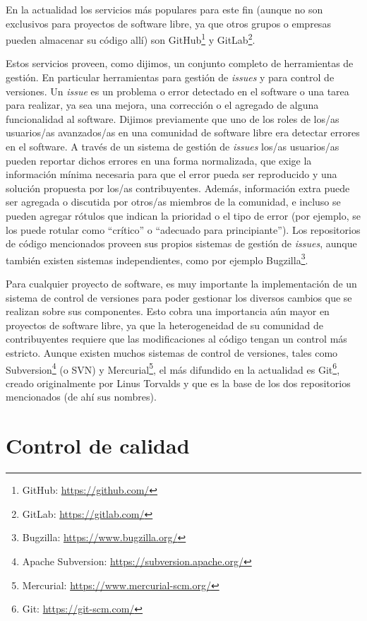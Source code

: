 En la actualidad los servicios más populares para este fin (aunque no son exclusivos para proyectos de software libre, ya que otros grupos o empresas pueden almacenar su código allí) son GitHub\footnote{GitHub: \url{https://github.com/}} y GitLab\footnote{GitLab: \url{https://gitlab.com/}}.

Estos servicios proveen, como dijimos, un conjunto completo de herramientas de gestión. En particular herramientas para gestión de \emph{issues} y para control de versiones. Un \emph{issue} es un problema o error detectado en el software o una tarea para realizar, ya sea una mejora, una corrección o el agregado de alguna funcionalidad al software. Dijimos previamente que uno de los roles de los/as usuarios/as avanzados/as en una comunidad de software libre era detectar errores en el software. A través de un sistema de gestión de \emph{issues} los/as usuarios/as pueden reportar dichos errores en una forma normalizada, que exige la información mínima necesaria para que el error pueda ser reproducido y una solución propuesta por los/as contribuyentes. Además, información extra puede ser agregada o discutida por otros/as miembros de la comunidad, e incluso se pueden agregar rótulos que indican la prioridad o el tipo de error (por ejemplo, se los puede rotular como ``crítico'' o ``adecuado para principiante''). Los repositorios de código mencionados proveen sus propios sistemas de gestión de \emph{issues}, aunque también existen sistemas independientes, como por ejemplo Bugzilla\footnote{Bugzilla: \url{https://www.bugzilla.org/}}.


Para cualquier proyecto de software, es muy importante la implementación de un sistema de control de versiones para poder gestionar los diversos cambios que se realizan sobre sus componentes. Esto cobra una importancia aún mayor en proyectos de software libre, ya que la heterogeneidad de su comunidad de contribuyentes requiere que las modificaciones al código tengan un control más estricto. Aunque existen muchos sistemas de control de versiones, tales como Subversion\footnote{Apache Subversion: \url{https://subversion.apache.org/}} (o SVN) y Mercurial\footnote{Mercurial: \url{https://www.mercurial-scm.org/}}, el más difundido en la actualidad es Git\footnote{Git: \url{https://git-scm.com/}}, creado originalmente por Linus Torvalds y que es la base de los dos repositorios mencionados (de ahí sus nombres).


\section{Control de calidad}


